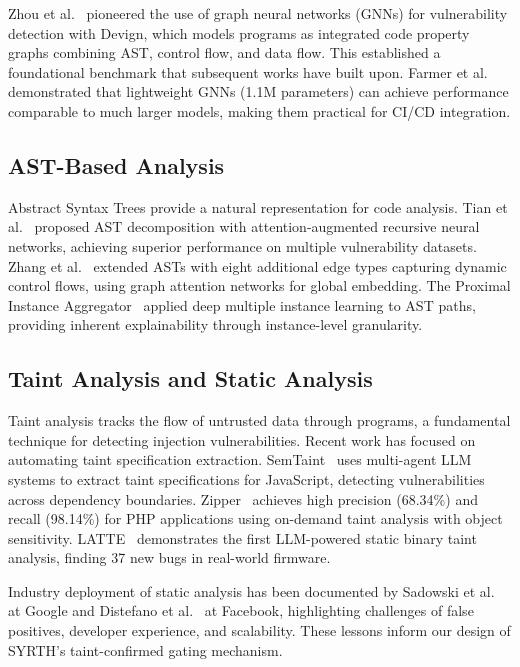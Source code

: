 \documentclass[12pt,a4paper]{article}
\begin{document}
Zhou et al.~\cite{zhou2019devign} pioneered the use of graph neural networks (GNNs) for vulnerability detection with Devign, which models programs as integrated code property graphs combining AST, control flow, and data flow. This established a foundational benchmark that subsequent works have built upon. Farmer et al.~\cite{farmer2026vulgnn} demonstrated that lightweight GNNs (1.1M parameters) can achieve performance comparable to much larger models, making them practical for CI/CD integration.

\subsection{AST-Based Analysis}

Abstract Syntax Trees provide a natural representation for code analysis. Tian et al.~\cite{tian2023trvd} proposed AST decomposition with attention-augmented recursive neural networks, achieving superior performance on multiple vulnerability datasets. Zhang et al.~\cite{zhang2026exastrvd} extended ASTs with eight additional edge types capturing dynamic control flows, using graph attention networks for global embedding. The Proximal Instance Aggregator~\cite{proximal2022} applied deep multiple instance learning to AST paths, providing inherent explainability through instance-level granularity.

\subsection{Taint Analysis and Static Analysis}

Taint analysis tracks the flow of untrusted data through programs, a fundamental technique for detecting injection vulnerabilities. Recent work has focused on automating taint specification extraction. SemTaint~\cite{semtaint2026} uses multi-agent LLM systems to extract taint specifications for JavaScript, detecting vulnerabilities across dependency boundaries. Zipper~\cite{zipper2025} achieves high precision (68.34\%) and recall (98.14\%) for PHP applications using on-demand taint analysis with object sensitivity. LATTE~\cite{latte2025} demonstrates the first LLM-powered static binary taint analysis, finding 37 new bugs in real-world firmware.

Industry deployment of static analysis has been documented by Sadowski et al.~\cite{sadowski2018lessons} at Google and Distefano et al.~\cite{distefano2019scaling} at Facebook, highlighting challenges of false positives, developer experience, and scalability. These lessons inform our design of SYRTH's taint-confirmed gating mechanism.
\end{document}
